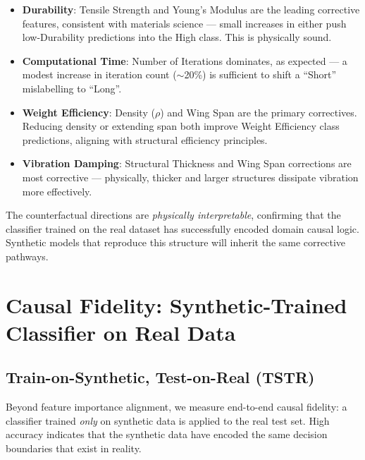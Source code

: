 \documentclass[12pt,a4paper]{article}
\begin{document}
\begin{tcolorbox}[insightbox, title={Domain Interpretation of Counterfactual Results}]
\begin{itemize}[noitemsep]
  \item \textbf{Durability}: Tensile Strength and Young's Modulus are the leading corrective features, consistent with materials science --- small increases in either push low-Durability predictions into the High class. This is physically sound.
  \item \textbf{Computational Time}: Number of Iterations dominates, as expected --- a modest increase in iteration count ($\sim$20\%) is sufficient to shift a ``Short'' mislabelling to ``Long''.
  \item \textbf{Weight Efficiency}: Density ($\rho$) and Wing Span are the primary correctives. Reducing density or extending span both improve Weight Efficiency class predictions, aligning with structural efficiency principles.
  \item \textbf{Vibration Damping}: Structural Thickness and Wing Span corrections are most corrective --- physically, thicker and larger structures dissipate vibration more effectively.
\end{itemize}
The counterfactual directions are \emph{physically interpretable}, confirming that the classifier trained on the real dataset has successfully encoded domain causal logic. Synthetic models that reproduce this structure will inherit the same corrective pathways.
\end{tcolorbox}

\section{Causal Fidelity: Synthetic-Trained Classifier on Real Data}

\subsection{Train-on-Synthetic, Test-on-Real (TSTR)}

Beyond feature importance alignment, we measure end-to-end causal fidelity: a classifier trained \emph{only} on synthetic data is applied to the real test set. High accuracy indicates that the synthetic data have encoded the same decision boundaries that exist in reality.
\end{document}
